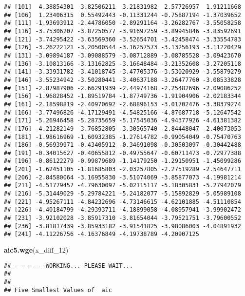 \documentclass[]{article}
\newenvironment{Shaded}{\begin{snugshade}}{\end{snugshade}}
\newcommand{\DecValTok}[1]{\textcolor[rgb]{0.00,0.00,0.81}{#1}}
\newcommand{\KeywordTok}[1]{\textcolor[rgb]{0.13,0.29,0.53}{\textbf{#1}}}
\newcommand{\NormalTok}[1]{#1}
\begin{document}
\begin{verbatim}
## [101]  4.38854301  3.82506211  3.21831982  2.57726957  1.91211668
## [106]  1.23406315  0.55492443 -0.11331244 -0.75887194 -1.37039652
## [111] -1.93693912 -2.44786050 -2.89291164 -3.26282767 -3.55058258
## [116] -3.75306207 -3.87250577 -3.91697259 -3.89945846 -3.83592691
## [121] -3.74295422 -3.63569360 -3.52654701 -3.42458474 -3.33554783
## [126] -3.26222121 -3.20500544 -3.16257573 -3.13256193 -3.11220429
## [131] -3.09894187 -3.09088579 -3.08712889 -3.08785528 -3.09423670
## [136] -3.10813166 -3.13162825 -3.16648484 -3.21352608 -3.27205118
## [141] -3.33931782 -3.41018745 -3.47705376 -3.53020929 -3.55879279
## [146] -3.55234942 -3.50280441 -3.40637188 -3.26477760 -3.08533828
## [151] -2.87987906 -2.66291939 -2.44974168 -2.25482696 -2.09086252
## [156] -1.96828452 -1.89519784 -1.87749736 -1.91904906 -2.02183344
## [161] -2.18598819 -2.40970692 -2.68896153 -3.01702476 -3.38379274
## [166] -3.77496826 -4.17129491 -4.54825166 -4.87687718 -5.12647542
## [171] -5.26946458 -5.28735659 -5.17545036 -4.94377926 -4.61381382
## [176] -4.21282149 -3.76852805 -3.30565740 -2.84448047 -2.40073053
## [181] -1.98616969 -1.60932385 -1.27614782 -0.99054049 -0.75470763
## [186] -0.56939971 -0.43405912 -0.34691098 -0.30503097 -0.30442488
## [191] -0.34015627 -0.40655812 -0.49755647 -0.60711473 -0.72977388
## [196] -0.86122279 -0.99879689 -1.14179250 -1.29150951 -1.45099286
## [201] -1.62451105 -1.81685803 -2.03257805 -2.27519289 -2.54647711
## [206] -2.84580064 -3.16955830 -3.51074069 -3.85877073 -4.19981214
## [211] -4.51779457 -4.79630097 -5.02115117 -5.18305831 -5.27942079
## [216] -5.31449029 -5.29784221 -5.24182077 -5.15892829 -5.05989108
## [221] -4.95267111 -4.84232696 -4.73146615 -4.62101885 -4.51110854
## [226] -4.40184799 -4.29393711 -4.18899058 -4.08957941 -3.99902472
## [231] -3.92102028 -3.85917310 -3.81654044 -3.79521751 -3.79600552
## [236] -3.81817439 -3.85933182 -3.91541825 -3.98086003 -4.04891932
## [241] -4.11226756 -4.16376849 -4.19738789 -4.20907125
\end{verbatim}

\begin{Shaded}
\begin{Highlighting}[]
\KeywordTok{aic5.wge}\NormalTok{(x_diff_}\DecValTok{12}\NormalTok{)}
\end{Highlighting}
\end{Shaded}

\begin{verbatim}
## ---------WORKING... PLEASE WAIT... 
## 
## 
## Five Smallest Values of  aic
\end{verbatim}
\end{document}
